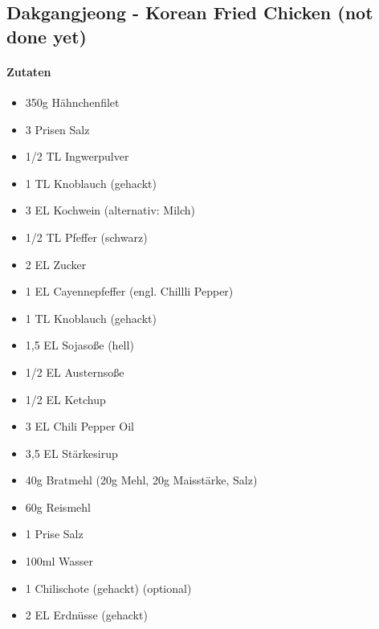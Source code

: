 \newpage
\subsection{Dakgangjeong - Korean Fried Chicken (not done yet)}
\paragraph{Zutaten}
\begin{itemize}[noitemsep]
	\item 350g Hähnchenfilet
	\item 3 Prisen Salz
	\item 1/2 TL Ingwerpulver
	\item 1 TL Knoblauch (gehackt)
	\item 3 EL Kochwein (alternativ: Milch)
	\item 1/2 TL Pfeffer (schwarz)
	\item 2 EL Zucker
	\item 1 EL Cayennepfeffer (engl. Chillli Pepper)
	\item 1 TL Knoblauch (gehackt)
	\item 1,5 EL Sojasoße (hell)
	\item 1/2 EL Austernsoße
	\item 1/2 EL Ketchup
	\item 3 EL Chili Pepper Oil 
	\item 3,5 EL Stärkesirup 
	\item 40g Bratmehl (20g Mehl, 20g Maisstärke, Salz)
	\item 60g Reismehl
	\item 1 Prise Salz
	\item 100ml Wasser  
	\item 1 Chilischote (gehackt) (optional)
	\item 2 EL Erdnüsse (gehackt)
\end{itemize}
